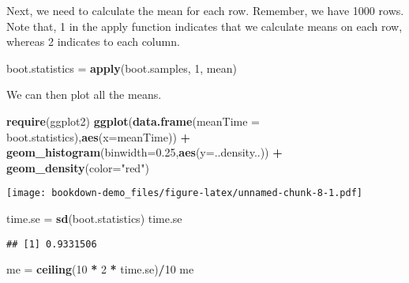 \documentclass[]{book}
\newenvironment{Shaded}{\begin{snugshade}}{\end{snugshade}}
\newcommand{\DataTypeTok}[1]{\textcolor[rgb]{0.13,0.29,0.53}{#1}}
\newcommand{\DecValTok}[1]{\textcolor[rgb]{0.00,0.00,0.81}{#1}}
\newcommand{\FloatTok}[1]{\textcolor[rgb]{0.00,0.00,0.81}{#1}}
\newcommand{\KeywordTok}[1]{\textcolor[rgb]{0.13,0.29,0.53}{\textbf{#1}}}
\newcommand{\NormalTok}[1]{#1}
\newcommand{\OperatorTok}[1]{\textcolor[rgb]{0.81,0.36,0.00}{\textbf{#1}}}
\newcommand{\StringTok}[1]{\textcolor[rgb]{0.31,0.60,0.02}{#1}}
\begin{document}
Next, we need to calculate the mean for each row. Remember, we have 1000 rows. Note that, 1 in the apply function indicates that we calculate means on each row, whereas 2 indicates to each column.

\begin{Shaded}
\begin{Highlighting}[]
\NormalTok{boot.statistics =}\StringTok{ }\KeywordTok{apply}\NormalTok{(boot.samples, }\DecValTok{1}\NormalTok{, mean)}
\end{Highlighting}
\end{Shaded}

We can then plot all the means.

\begin{Shaded}
\begin{Highlighting}[]
\KeywordTok{require}\NormalTok{(ggplot2)}
\KeywordTok{ggplot}\NormalTok{(}\KeywordTok{data.frame}\NormalTok{(}\DataTypeTok{meanTime =}\NormalTok{ boot.statistics),}\KeywordTok{aes}\NormalTok{(}\DataTypeTok{x=}\NormalTok{meanTime)) }\OperatorTok{+}
\KeywordTok{geom_histogram}\NormalTok{(}\DataTypeTok{binwidth=}\FloatTok{0.25}\NormalTok{,}\KeywordTok{aes}\NormalTok{(}\DataTypeTok{y=}\NormalTok{..density..)) }\OperatorTok{+}
\KeywordTok{geom_density}\NormalTok{(}\DataTypeTok{color=}\StringTok{"red"}\NormalTok{)}
\end{Highlighting}
\end{Shaded}

\texttt{[image: bookdown-demo\_files/figure-latex/unnamed-chunk-8-1.pdf]}

\begin{Shaded}
\begin{Highlighting}[]
\NormalTok{time.se =}\StringTok{ }\KeywordTok{sd}\NormalTok{(boot.statistics)}
\NormalTok{time.se}
\end{Highlighting}
\end{Shaded}

\begin{verbatim}
## [1] 0.9331506
\end{verbatim}

\begin{Shaded}
\begin{Highlighting}[]
\NormalTok{me =}\StringTok{ }\KeywordTok{ceiling}\NormalTok{(}\DecValTok{10} \OperatorTok{*}\StringTok{ }\DecValTok{2} \OperatorTok{*}\StringTok{ }\NormalTok{time.se)}\OperatorTok{/}\DecValTok{10}
\NormalTok{me}
\end{Highlighting}
\end{Shaded}
\end{document}
